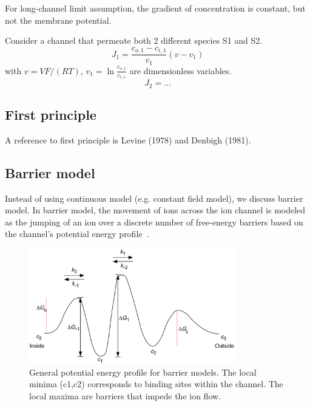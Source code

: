 For long-channel limit assumption, the gradient of concentration is
constant, but not the membrane potential.

Consider a channel that permeate both 2 different species S1 and S2.
\begin{equation}
  \label{eq:1383}
  J_1 = \frac{c_{o,1}-c_{i,1}}{v_1}(v-v_1)
\end{equation}
with $v =VF/(RT)$, $v_1=\ln\frac{c_{o,1}}{c_{i,1}}$ are dimensionless variables.
\begin{equation}
  \label{eq:1384}
  J_2 = ...
\end{equation}


\subsection{First principle}
\label{sec:first-principle}


A reference to first principle is Levine (1978) and Denbigh (1981).



\subsection{Barrier model}
\label{sec:barrier-model}


Instead of using continuous model (e.g. constant field model), we
discuss barrier model. In barrier model, the movement of ions across
the ion channel is modeled as the jumping of an ion over a discrete
number of free-energy barriers based on the channel's potential energy
profile~\citep{eyring1949,woodbury1971,lauger1973}.

\begin{figure}[hbt]
  \centerline{\includegraphics[height=5cm,
    angle=0]{./images/barrier_model.eps}}
  \caption{General potential energy profile for barrier models. The
    local minima (c1,c2) corresponds to binding sites within the
    channel. The local maxima are barriers that impede the ion flow.}
  \label{fig:barrier_model}
\end{figure}

